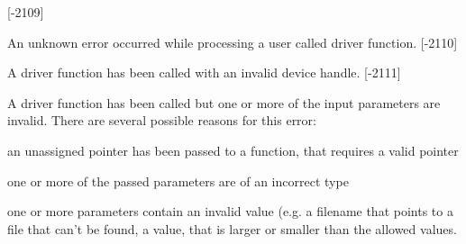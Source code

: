 \begin{Desc}
\begin{description}
{\bfseries }\mbox{[}-\/2109\mbox{]} \item[{\em 
\hypertarget{group___common_interface_gga112225e5fbaaaef6445ff4ebf98f8e03afa5e261406c20fe786a8ad38aefaea7e}{D\+E\+V\+\_\+\+U\+N\+K\+N\+O\+W\+N\+\_\+\+E\+R\+R\+O\+R}\label{group___common_interface_gga112225e5fbaaaef6445ff4ebf98f8e03afa5e261406c20fe786a8ad38aefaea7e}
}]An unknown error occurred while processing a user called driver function. {\bfseries }\mbox{[}-\/2110\mbox{]} \item[{\em 
\hypertarget{group___common_interface_gga112225e5fbaaaef6445ff4ebf98f8e03a96582eb5b9b810c368e4dd9a6a33d8dc}{D\+E\+V\+\_\+\+H\+A\+N\+D\+L\+E\+\_\+\+I\+N\+V\+A\+L\+I\+D}\label{group___common_interface_gga112225e5fbaaaef6445ff4ebf98f8e03a96582eb5b9b810c368e4dd9a6a33d8dc}
}]A driver function has been called with an invalid device handle. {\bfseries }\mbox{[}-\/2111\mbox{]} \item[{\em 
\hypertarget{group___common_interface_gga112225e5fbaaaef6445ff4ebf98f8e03a133562bf8ce62ef9d7c7e42b49fc5251}{D\+E\+V\+\_\+\+I\+N\+P\+U\+T\+\_\+\+P\+A\+R\+A\+M\+\_\+\+I\+N\+V\+A\+L\+I\+D}\label{group___common_interface_gga112225e5fbaaaef6445ff4ebf98f8e03a133562bf8ce62ef9d7c7e42b49fc5251}
}]A driver function has been called but one or more of the input parameters are invalid. There are several possible reasons for this error\+:
\begin{DoxyItemize}
\item an unassigned pointer has been passed to a function, that requires a valid pointer
\item one or more of the passed parameters are of an incorrect type
\item one or more parameters contain an invalid value (e.\+g. a filename that points to a file that can't be found, a value, that is larger or smaller than the allowed values.
\end{DoxyItemize}


\end{description}
\end{Desc}
